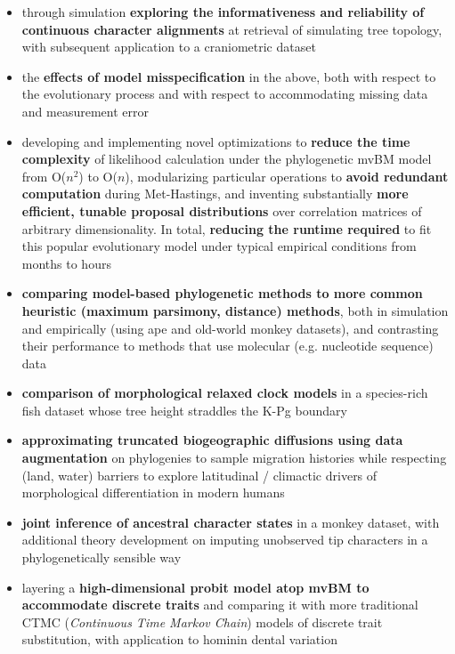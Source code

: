 \documentclass[12pt]{article}
\begin{document}
\begin{itemize}[noitemsep]

\item through simulation \textbf{exploring the informativeness and reliability of continuous character alignments} at retrieval of simulating tree topology, with subsequent application to a craniometric dataset 
\item the \textbf{effects of model misspecification} in the above, both with respect to the evolutionary process and with respect to accommodating missing data and measurement error
\item developing and implementing novel optimizations to \textbf{reduce the time complexity} of likelihood calculation under the phylogenetic mvBM model from O($n^2$) to O($n$), modularizing particular operations to \textbf{avoid redundant computation} during Met-Hastings, and inventing substantially \textbf{more efficient, tunable proposal distributions} over correlation matrices of arbitrary dimensionality. In total, \textbf{reducing the runtime required} to fit this popular evolutionary model under typical empirical conditions from months to hours
\item \textbf{comparing model-based phylogenetic methods to more common heuristic (maximum parsimony, distance) methods}, both in simulation and empirically (using ape and old-world monkey datasets), and contrasting their performance to methods that use molecular (e.g. nucleotide sequence) data
\item \textbf{comparison of morphological relaxed clock models} in a species-rich fish dataset whose tree height straddles the K-Pg boundary
\item \textbf{approximating truncated biogeographic diffusions using data augmentation} on phylogenies to sample migration histories while respecting (land, water) barriers to explore latitudinal / climactic drivers of morphological differentiation in modern humans 
\item \textbf{joint inference of ancestral character states} in a monkey dataset, with additional theory development on imputing unobserved tip characters in a phylogenetically sensible way 
\item layering a \textbf{high-dimensional probit model atop mvBM to accommodate discrete traits} and comparing it with more traditional CTMC (\emph{Continuous Time Markov Chain}) models of discrete trait substitution, with application to hominin dental variation

\end{itemize}
\end{document}
